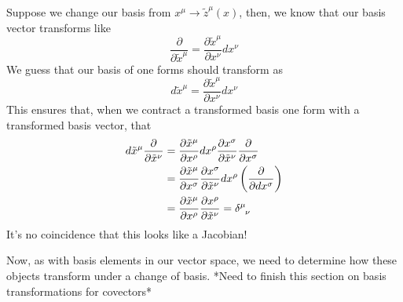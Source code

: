 Suppose we change our basis from $ x^\mu \to \tilde{z}^\mu ( x)  $, 
then, we know that our basis vector transforms like 
\[
\frac{\partial }{\partial \tilde{x }^\mu }  = \frac{\partial \tilde{x }^\mu }{\partial x^\nu} dx^\nu  
\] We guess that our basis of one forms 
should transform as 
\[
d \tilde{x }^\mu = \frac{\partial \tilde{x}^\mu }{\partial x^\nu} dx^\nu  
\] This ensures that, when we contract a transformed basis one form 
with a transformed basis vector, that
\begin{align*}
d \tilde{x }^\mu \frac{\partial }{\partial \tilde{x }^\nu } &=  \frac{\partial \tilde{x }^\mu}{ \partial x^\rho} dx^\rho \frac{\partial x^\sigma}{\partial \tilde{x }^\nu } \frac{\partial }{\partial x^\sigma}    \\
							    &=  \frac{\partial \tilde{x }^\mu }{\partial x^\sigma} \frac{\partial x^\sigma}{\partial \tilde{ x}^\nu } dx^\rho \left( \frac{\partial }{\partial dx^\sigma}  \right)    \\
							    &=  \frac{\partial \tilde{x}^\mu }{\partial x^\rho} \frac{\partial x^\rho}{\partial \tilde{x }^\nu }  = \delta \indices{^\mu_\nu} 
\end{align*} It's no coincidence that this looks like a Jacobian! 

Now, as with basis elements in our vector space, 
we need to determine how these objects transform under a change of basis. 
*Need to finish this section on basis transformations for covectors* 

